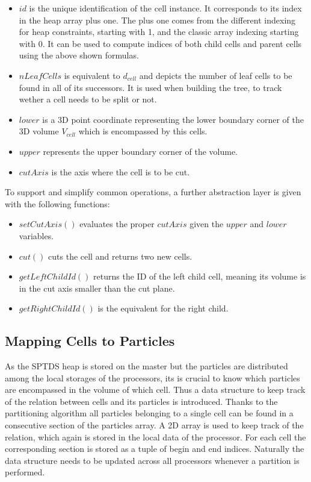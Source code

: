 \documentclass[]{article}
\begin{document}
\begin{itemize}
	\item $id$ is the unique identification of the cell instance. It corresponds to its index in the heap array plus one. The plus one comes from the different indexing for heap constraints, starting with 1, and the classic array indexing starting with 0. It can be used to compute  indices of both child cells and parent cells using the above shown formulas.
	\item $nLeafCells$ is equivalent to  $d_{cell}$ and depicts the number of leaf cells to be found in all of its successors. It is used when building the tree, to track wether a cell needs to be split or not. 
	\item $lower$ is a 3D point coordinate representing the lower boundary corner of the 3D volume $V_{cell}$ which is encompassed by this cells.
	\item $upper$ represents the upper boundary corner of the volume.	
	\item $cutAxis$ is the axis where the cell is to be cut. 
\end{itemize}

To support and simplify common operations, a further abstraction layer is given with the following functions:


\begin{itemize}
	\item $setCutAxis()$ evaluates the proper $cutAxis$ given the $upper$ and $lower$ variables.
	\item $cut()$ cuts the cell and returns two new cells. 
	\item $getLeftChildId()$ returns the ID of the left child cell, meaning its volume is in the cut axis smaller than the cut plane. 
	\item $getRightChildId()$ is the equivalent for the right child. 
\end{itemize} 

\subsection{Mapping Cells to Particles}

As the SPTDS heap is stored on the master but the particles are distributed among the local storages of the processors, its is crucial to know which particles are encompassed in the volume of which cell. Thus a data structure to keep track of the relation between cells and its particles is introduced.
Thanks to the partitioning algorithm all particles belonging to a single cell can be found in a consecutive section of the particles array. A 2D array is used to keep track of the relation, which again is stored in the local data of the processor. For each cell the corresponding section is stored as a tuple of begin and end indices. Naturally the data structure needs to be updated across all processors whenever a partition is performed.
\end{document}
